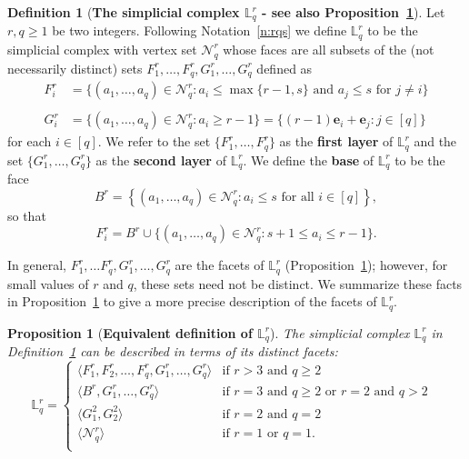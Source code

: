 \documentclass[11pt]{article}
\newtheorem{prop}[theo]{Proposition}
\theoremstyle{definition}
\newtheorem{defi}[theo]{Definition}
\numberwithin{equation}{section}
\newcommand{\N}{\mathcal{N}}
\newcommand{\Nrq}{\mathcal{N}^r_q}
\newcommand{\Lrq}{\mathbb{L}^r_q}
\newcommand{\be}{\mathbf{e}}
\begin{document}
\begin{defi}[{\bf The simplicial complex $\Lrq$ - see also Proposition~\ref{p:Lrq}}]\label{d:Lrq}
Let~$r, q\ge 1$ be two integers. Following Notation~\ref{n:rqs} we define
$\Lrq$ to be the simplicial complex with vertex set $\Nrq$ whose faces
are all subsets of the (not necessarily distinct) sets $F^r_1, \dots,
F^r_{q}, G^r_1, \ldots , G^r_q$ defined as
\begin{align*}
F^r_i &=\{(a_1, \ldots, a_q) \in \Nrq \colon a_i \le \max\{r-1, s\} \mbox{ and }
a_j \leq s \mbox{ for } j \neq i\}\\ {}&\\ G^r_i&=\{(a_1, \ldots, a_q)
\in \Nrq \colon a_i \ge r-1\} = \{(r-1) \be_i + \be_j \colon j \in
    [q]\}
\end{align*}
for each $i\in [q]$.  We refer to the set $\{F^r_1, \dots, F^r_q\}$ as
the {\bf first layer} of $\Lrq$ and the set $\{G^r_1, \dots, G^r_q\}$
as the {\bf second layer} of $\Lrq$. We define the {\bf base} of
$\Lrq$ to be the face $$B^r=\left\{(a_1, \ldots, a_q) \in \Nrq \colon
a_i \le s \mbox{ for all } i\in [q] \right\},$$ so that
$$F_i^r=B^r \cup \{(a_1, \ldots, a_q) \in \Nrq \colon s+1 \le a_i \le r-1\}.$$
\end{defi}


In general, $F^r_1, \ldots F^r_q, G^r_1, \ldots , G^r_q$ are the
facets of $\Lrq$ (Proposition~\ref{p:Lrq}); however, for small values of $r$
and $q$, these sets need not be distinct. We summarize these facts
in Proposition~\ref{p:Lrq} to give a more precise description of the facets of
$\Lrq$.


\begin{prop}[{\bf Equivalent definition of $\Lrq$}] 
\label{p:Lrq}
The simplicial complex $\Lrq$ in Definition~\ref{d:Lrq} can be described in
terms of its distinct facets:
$$
\Lrq=\begin{cases}
\langle F^r_1, F^r_2, \dots, F^r_q, G^r_1,\dots, G^r_q\rangle &
\text{if $r>3$ and $q\ge 2$}\\
\langle B^r, G^r_1,\dots, G^r_q\rangle &
\text{if $r = 3$ and $q\geq 2$ or $r = 2$ and $q > 2$ }\\
\langle G^2_1, G^2_2\rangle &
\text{if $r = 2$ and $q=2$}\\
\langle \N^r_q \rangle &
\text{if $r=1$ or $q=1$.}\\
\end{cases}
$$  
\end{prop}
\end{document}
